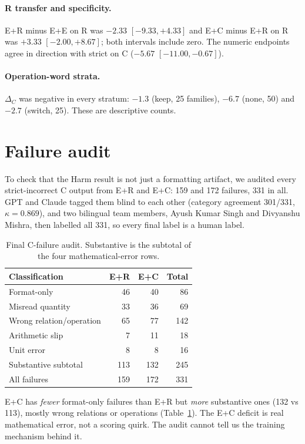 \documentclass[12pt,a4paper,oneside]{report}
\renewcommand{\_}{\oldunderscore\allowbreak}
\begin{document}
\paragraph{R transfer and specificity.} E+R minus E+E on R was $-2.33$ $[-9.33,+4.33]$ and E+C minus E+R on R was $+3.33$ $[-2.00,+8.67]$; both intervals include zero. The numeric endpoints agree in direction with strict on C ($-5.67$ $[-11.00,-0.67]$).

\paragraph{Operation-word strata.} $\Delta_C$ was negative in every stratum: $-1.3$ (keep, 25 families), $-6.7$ (none, 50) and $-2.7$ (switch, 25). These are descriptive counts.

\section{Failure audit}

To check that the Harm result is not just a formatting artifact, we audited every strict-incorrect C output from E+R and E+C: 159 and 172 failures, 331 in all. GPT and Claude tagged them blind to each other (category agreement 301/331, $\kappa = 0.869$), and two bilingual team members, Ayush Kumar Singh and Divyanshu Mishra, then labelled all 331, so every final label is a human label.

\begin{table}[t]
\centering\small
\caption{Final C-failure audit. Substantive is the subtotal of the four mathematical-error rows.}
\label{tab:phase2-final-audit}
\begin{tabular}{@{}lrrr@{}}
\toprule
Classification & E+R & E+C & Total\\
\midrule
Format-only & 46 & 40 & 86\\
Misread quantity & 33 & 36 & 69\\
Wrong relation/operation & 65 & 77 & 142\\
Arithmetic slip & 7 & 11 & 18\\
Unit error & 8 & 8 & 16\\
\midrule
Substantive subtotal & 113 & 132 & 245\\
All failures & 159 & 172 & 331\\
\bottomrule
\end{tabular}
\end{table}

E+C has \emph{fewer} format-only failures than E+R but \emph{more} substantive ones (132 vs 113), mostly wrong relations or operations (Table~\ref{tab:phase2-final-audit}). The E+C deficit is real mathematical error, not a scoring quirk. The audit cannot tell us the training mechanism behind it.
\end{document}
